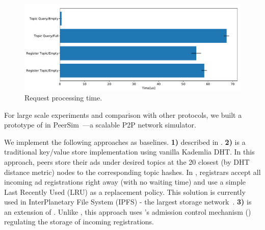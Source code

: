 \begin{figure}
\centering
\includegraphics[width=\linewidth]{results/testbed/op_time.pdf}
\caption{Request processing time.}
\label{fig:op_time}
\vspace{-0.15in}
\end{figure}

 For large scale experiments and comparison with other protocols, we built a prototype of \sysname in PeerSim~\cite{p2p09-peersim}---a scalable P2P network simulator. %

We implement the following approaches as baselines. \textbf{1) \discv} described in . \textbf{2) \altname} is a traditional key/value store implementation using vanilla Kademlia DHT.  In this approach, peers store their ads under desired topics at the 20 closest (by DHT distance metric) nodes to the corresponding topic hashes. In \altname, registrars accept all incoming ad registrations right away (\ie with no waiting time) and use a simple Last Recently Used (LRU) as a replacement policy. This solution is currently used in InterPlanetary File System (IPFS) - the largest storage network~\cite{libp2p_kaddht}. \textbf{3) \altnameticket} is an extension of \altname. Unlike \altname, this approach uses \sysname's admission control mechanism () regulating the storage of incoming registrations. 


